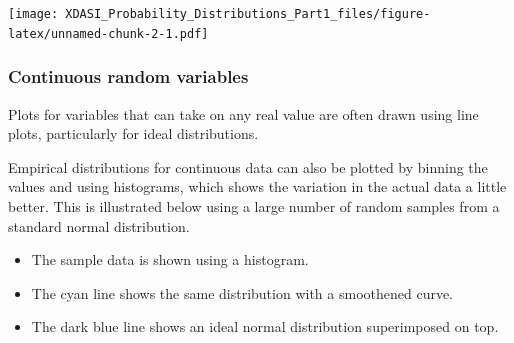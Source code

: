 \documentclass[
]{article}
\providecommand{\tightlist}{%
  \setlength{\itemsep}{0pt}\setlength{\parskip}{0pt}}
\begin{document}
\texttt{[image: XDASI\_Probability\_Distributions\_Part1\_files/figure-latex/unnamed-chunk-2-1.pdf]}

\hypertarget{continuous-random-variables}{%
\subsubsection{Continuous random
variables}\label{continuous-random-variables}}

Plots for variables that can take on any real value are often drawn
using line plots, particularly for ideal distributions.

Empirical distributions for continuous data can also be plotted by
binning the values and using histograms, which shows the variation in
the actual data a little better. This is illustrated below using a large
number of random samples from a standard normal distribution.

\begin{itemize}
\tightlist
\item
  The sample data is shown using a histogram.
\item
  The cyan line shows the same distribution with a smoothened curve.
\item
  The dark blue line shows an ideal normal distribution superimposed on
  top.
\end{itemize}
\end{document}

